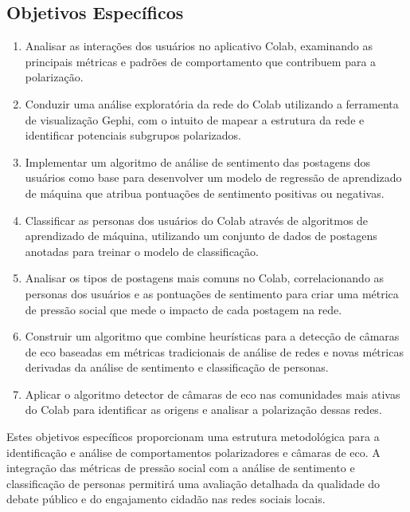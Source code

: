 \subsection{Objetivos Específicos}
\begin{enumerate}
	\item Analisar as interações dos usuários no aplicativo Colab, examinando as principais métricas e padrões de comportamento que contribuem para a polarização.

	\item Conduzir uma análise exploratória da rede do Colab utilizando a ferramenta de visualização Gephi, com o intuito de mapear a estrutura da rede e identificar potenciais subgrupos polarizados.

	\item Implementar um algoritmo de análise de sentimento das postagens dos usuários como base para desenvolver um modelo de regressão de aprendizado de máquina que atribua pontuações de sentimento positivas ou negativas.

	\item Classificar as personas dos usuários do Colab através de algoritmos de aprendizado de máquina, utilizando um conjunto de dados de postagens anotadas para treinar o modelo de classificação.

	\item Analisar os tipos de postagens mais comuns no Colab, correlacionando as personas dos usuários e as pontuações de sentimento para criar uma métrica de pressão social que mede o impacto de cada postagem na rede.

	\item Construir um algoritmo que combine heurísticas para a detecção de câmaras de eco baseadas em métricas tradicionais de análise de redes e novas métricas derivadas da análise de sentimento e classificação de personas.

	\item Aplicar o algoritmo detector de câmaras de eco nas comunidades mais ativas do Colab para identificar as origens e analisar a polarização dessas redes.
\end{enumerate}

Estes objetivos específicos proporcionam uma estrutura metodológica para a identificação e análise de comportamentos polarizadores e câmaras de eco. A integração das métricas de pressão social com a análise de sentimento e classificação de personas permitirá uma avaliação detalhada da qualidade do debate público e do engajamento cidadão nas redes sociais locais.